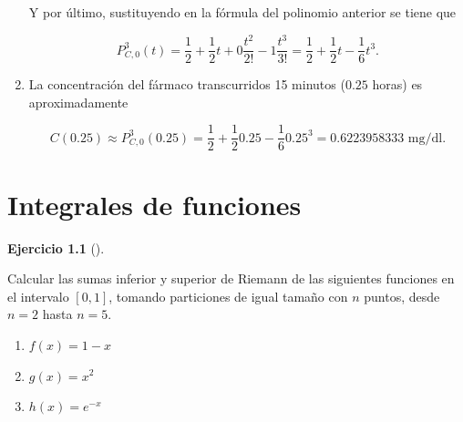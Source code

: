 \documentclass[
  a4paper,
]{scrreport}
\theoremstyle{definition}
\newtheorem{exercise}{Ejercicio}[chapter]
\theoremstyle{remark}
\begin{document}
\begin{tcolorbox}
\begin{enumerate}
  Y por último, sustituyendo en la fórmula del polinomio anterior se
  tiene que

  \[
   P_{C,0}^3(t)=\frac{1}{2}+\frac{1}{2}t+0\frac{t^2}{2!}-1\frac{t^3}{3!}=\frac{1}{2}+\frac{1}{2}t-\frac{1}{6}t^3.
   \]
\item
  La concentración del fármaco transcurridos 15 minutos (\(0.25\) horas)
  es aproximadamente

  \[
   C(0.25)\approx P_{C,0}^3(0.25)= \frac{1}{2}+\frac{1}{2}0.25-\frac{1}{6}0.25^3= 0.6223958333 \mbox{ mg/dl}.
   \]
\end{enumerate}

\end{tcolorbox}


\hypertarget{integrales-de-funciones}{%
\chapter{Integrales de funciones}\label{integrales-de-funciones}}

\begin{exercise}[]\protect\hypertarget{exr-sumas-inferiores-superiores-riemann}{}\label{exr-sumas-inferiores-superiores-riemann}

Calcular las sumas inferior y superior de Riemann de las siguientes
funciones en el intervalo \([0,1]\), tomando particiones de igual tamaño
con \(n\) puntos, desde \(n=2\) hasta \(n=5\).

\begin{enumerate}
\def\labelenumi{\alph{enumi}.}
\item
  \(f(x) = 1-x\)
\item
  \(g(x) = x^2\)
\item
  \(h(x) = e^{-x}\)
\end{enumerate}

\end{exercise}
\end{document}
